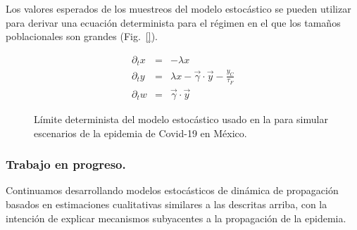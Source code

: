 Los valores esperados de los muestreos del modelo estocástico se pueden utilizar para derivar una ecuación determinista para el régimen en el que los tamaños poblacionales son grandes (Fig.~\ref{}). 
\begin{figure}[h]
\centering
\begin{minipage}{0.65\textwidth}
\begin{eqnarray*}
\partial_{t} x &=& -  \lambda x\\
\partial_{t} y &=& \lambda x - \vec{\gamma} \cdot \vec{y}  - \frac{y_{C}}{\tau_{F}}
\\
\partial_{t} w &=&\vec{\gamma} \cdot \vec{y}
\end{eqnarray*}
\end{minipage}%
\begin{minipage}{0.35\textwidth}
\centering
{}
\end{minipage}%
\caption{Límite determinista del modelo estocástico usado en la  para simular escenarios de la epidemia de Covid-19 en México. }
\end{figure}


\subsubsection*{Trabajo en progreso.} Continuamos desarrollando modelos estocásticos de dinámica de propagación basados en estimaciones cualitativas similares a las descritas arriba, con la intención de explicar mecanismos subyacentes a la propagación de la epidemia.  